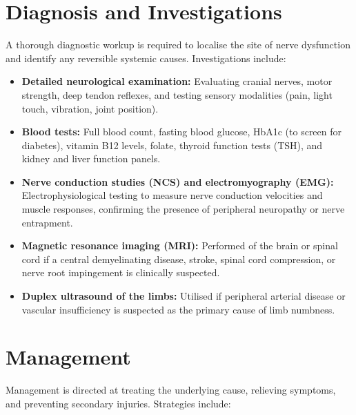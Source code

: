 \section*{Diagnosis and Investigations}
A thorough diagnostic workup is required to localise the site of nerve dysfunction and identify any reversible systemic causes. Investigations include:

\begin{itemize}
    \item \textbf{Detailed neurological examination:} Evaluating cranial nerves, motor strength, deep tendon reflexes, and testing sensory modalities (pain, light touch, vibration, joint position).
    \item \textbf{Blood tests:} Full blood count, fasting blood glucose, HbA1c (to screen for diabetes), vitamin B12 levels, folate, thyroid function tests (TSH), and kidney and liver function panels.
    \item \textbf{Nerve conduction studies (NCS) and electromyography (EMG):} Electrophysiological testing to measure nerve conduction velocities and muscle responses, confirming the presence of peripheral neuropathy or nerve entrapment.
    \item \textbf{Magnetic resonance imaging (MRI):} Performed of the brain or spinal cord if a central demyelinating disease, stroke, spinal cord compression, or nerve root impingement is clinically suspected.
    \item \textbf{Duplex ultrasound of the limbs:} Utilised if peripheral arterial disease or vascular insufficiency is suspected as the primary cause of limb numbness.
\end{itemize}

\section*{Management}
Management is directed at treating the underlying cause, relieving symptoms, and preventing secondary injuries. Strategies include:

